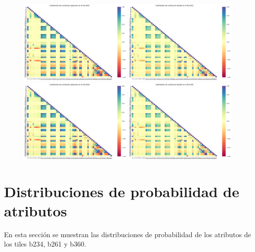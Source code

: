\begin{appendix}
\begin{figure}[h!]
\centering
  \includegraphics[width=0.49\textwidth]{Kap6/spearman_b261_MATRIX.png} 
  \includegraphics[width=0.49\textwidth]{Kap6/kendall_b261_MATRIX.png} \\
\centering
  \includegraphics[width=0.49\textwidth]{Kap6/spearman_b360_MATRIX.png} 
  \includegraphics[width=0.49\textwidth]{Kap6/kendall_b360_MATRIX.png}
\end{figure}

\newpage 
\section{Distribuciones de probabilidad de atributos}
\label{anexob_distribuciones}
En esta sección se muestran las distribuciones de probabilidad de los atributos de los tiles b234, b261 y b360.


\end{appendix}
